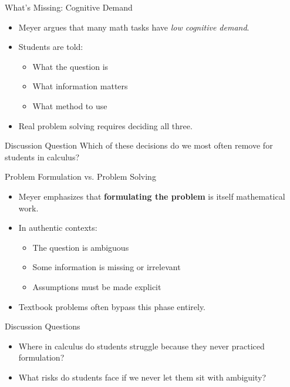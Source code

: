 \documentclass{beamer}
\begin{document}
\begin{frame}{What’s Missing: Cognitive Demand}
  \begin{itemize}
    \item Meyer argues that many math tasks have \emph{low cognitive demand}.
    \item Students are told:
    \begin{itemize}
      \item What the question is
      \item What information matters
      \item What method to use
    \end{itemize}
    \item Real problem solving requires deciding all three.
  \end{itemize}
  
  \begin{block}{Discussion Question}
    Which of these decisions do we most often remove for students in calculus?
  \end{block}
\end{frame}


\begin{frame}{Problem Formulation vs. Problem Solving}
  \begin{itemize}
    \item Meyer emphasizes that \textbf{formulating the problem} is itself mathematical work.
    \item In authentic contexts:
    \begin{itemize}
      \item The question is ambiguous
      \item Some information is missing or irrelevant
      \item Assumptions must be made explicit
    \end{itemize}
    \item Textbook problems often bypass this phase entirely.
  \end{itemize}
  
  \begin{block}{Discussion Questions}
    \begin{itemize}
      \item Where in calculus do students struggle because they never practiced formulation?
      \item What risks do students face if we never let them sit with ambiguity?
    \end{itemize}
  \end{block}
\end{frame}
\end{document}
